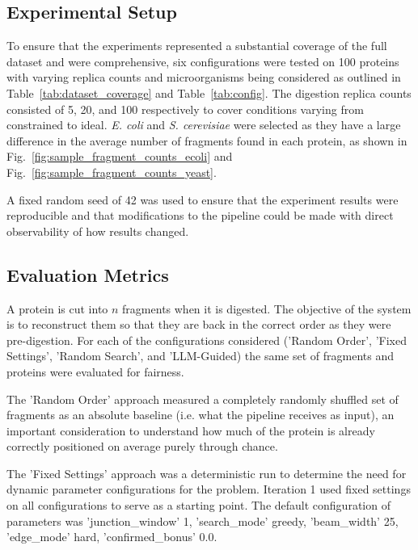 \documentclass[journal]{IEEEtran}
\begin{document}
\subsection{Experimental Setup}
To ensure that the experiments represented a substantial coverage of the full dataset and were
comprehensive, six configurations were tested on
100 proteins with varying replica counts and microorganisms being considered as outlined in
Table~\ref{tab:dataset_coverage} and Table~\ref{tab:config}. The digestion replica counts
consisted of 5, 20, and 100 respectively to cover conditions varying from constrained to ideal. \textit{E. coli} and \textit{S. cerevisiae} were selected
as they have a large difference in the average number of fragments found in each protein, as shown in
Fig.~\ref{fig:sample_fragment_counts_ecoli} and Fig.~\ref{fig:sample_fragment_counts_yeast}.





A fixed random seed of 42 was used to ensure that the experiment results were reproducible and that modifications
to the pipeline could be made with direct observability of how results changed.



\subsection{Evaluation Metrics}
A protein is cut into $n$ fragments when it is digested. The objective of the system
is to reconstruct them so that they are back in the correct order as they were pre-digestion.
For each of the configurations considered ('Random Order', 'Fixed Settings', 'Random Search', and 'LLM-Guided)
the same set of fragments and proteins were evaluated for fairness.

The 'Random Order' approach measured a completely randomly shuffled set of fragments as an absolute baseline (i.e. what the
pipeline receives as input),
an important consideration to understand how much of the protein is already correctly positioned on average purely through chance.

The 'Fixed Settings' approach was a deterministic run to determine the need for dynamic
parameter configurations for the problem. Iteration 1 used fixed settings on all configurations to serve
as a starting point. The default configuration of parameters was 'junction\_window' 1, 'search\_mode' greedy,
'beam\_width' 25, 'edge\_mode' hard, 'confirmed\_bonus' 0.0.
\end{document}
